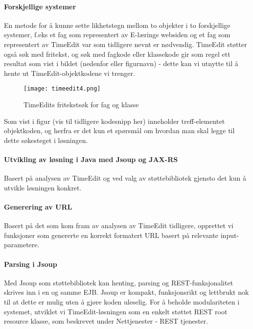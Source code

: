 \documentclass[../main.tex]{subfiles}
\begin{document}
\paragraph{Forskjellige systemer}

En metode for å kunne sette likhetstegn mellom to objekter i to forskjellige systemer, f.eks et fag som representert av E-lærings websiden og et fag som representert av TimeEdit var som tidligere nevnt er nødvendig.\newline
\newline
TimeEdit støtter også søk med fritekst, og søk med fagkode eller klassekode gir som regel ett resultat som vist i bildet (nedenfor eller figurnavn) - dette kan vi utnytte til å hente ut TimeEdit-objektkodene vi trenger.

\begin{figure}[H]
  \centering
  \texttt{[image: timeedit4.png]}
  \caption{TimeEdits fritekstsøk for fag og klasse}
\end{figure}

Som vist i figur (vis til tidligere kodesnipp her) inneholder treff-elementet objektkoden, og herfra er det kun et spørsmål om hvordan man skal legge til dette søkesteget i løsningen.

\paragraph{Utvikling av løsning i Java med Jsoup og JAX-RS}

Basert på analysen av TimeEdit og ved valg av støttebibliotek gjensto det kun å utvikle løsningen konkret. 

\paragraph{Generering av URL}

Basert på det som kom fram av analysen av TimeEdit tidligere, opprettet vi funksjoner som genererte en korrekt formatert URL basert på relevante input-parametere.

\paragraph{Parsing i Jsoup}
Med Jsoup som støttebibliotek kan henting, parsing og REST-funksjonalitet skrives inn i en og samme EJB. Jsoup er kompakt, funksjonsrikt og lettbrukt nok til at dette er mulig uten å gjøre koden uleselig. For å beholde modulariteten i systemet, utviklet vi TimeEdit-løsningen som en enkelt støttet REST root resource klasse, som beskrevet under Nettjenester - REST tjenester.
\end{document}
